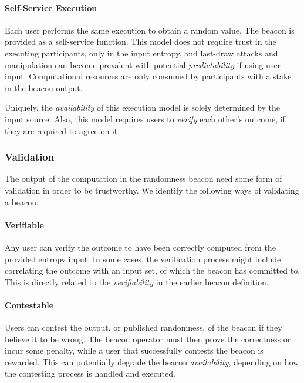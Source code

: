 \paragraph{Self-Service Execution}
    Each user performs the same execution to obtain a random value.
    The beacon is provided as a self-service function.
    This model does not require trust in the executing participants, only in the input entropy, and last-draw attacks and manipulation can become prevalent with potential \emph{predictability} if using user input.
    Computational resources are only consumed by participants with a stake in the beacon output.

    Uniquely, the \emph{availability} of this execution model is solely determined by the input source.
    Also, this model requires users to \emph{verify} each other's outcome, if they are required to agree on it.


\subsubsection{Validation}
The output of the computation in the randomness beacon need some form of validation in order to be trustworthy.
We identify the following ways of validating a beacon:

\paragraph{Verifiable}
    Any user can verify the outcome to have been correctly computed from the provided entropy input.
    In some cases, the verification process might include correlating the outcome with an input set, of which the beacon has committed to.
    This is directly related to the \emph{verifiability} in the earlier beacon definition.

\paragraph{Contestable}
    Users can contest the output, or published randomness, of the beacon if they believe it to be wrong.
    The beacon operator must then prove the correctness or incur some penalty, while a user that successfully contests the beacon is rewarded.
    This can potentially degrade the beacon \emph{availability}, depending on how the contesting process is handled and executed.

